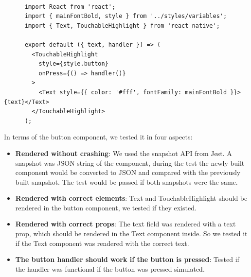 \documentclass[12pt,a4paper]{article}
\begin{document}
          \begin{lstlisting}[caption=Button.jsx, label={lst:Button.jsx}]

      import React from 'react';
      import { mainFontBold, style } from '../styles/variables';
      import { Text, TouchableHighlight } from 'react-native';

      export default ({ text, handler }) => (
        <TouchableHighlight
          style={style.button}
          onPress={() => handler()}
        >
          <Text style={{ color: '#fff', fontFamily: mainFontBold }}>{text}</Text>
        </TouchableHighlight>
      );

          \end{lstlisting}
        
          In terms of the button component, we tested it in four aspects: 
          \begin{itemize}
            \setlength\itemsep{0em}
            \item{\bf Rendered without crashing}: We used the snapshot API from Jest. A snapshot was JSON string of the component, during the test the newly built component would be converted to JSON and compared with the previously built snapshot. The test would be passed if both snapshots were the same.  
            \item{\bf Rendered with correct elements}: Text and TouchableHighlight should be rendered in the button component, we tested if they existed.
            \item{\bf Rendered with correct props}: The text field was rendered with a text prop, which should be rendered in the Text component inside. So we tested it if the Text component was rendered with the correct text.
            \item{\bf The button handler should work if the button is pressed}: Tested if the handler was functional if the button was pressed simulated.
          \end{itemize} 
\end{document}
